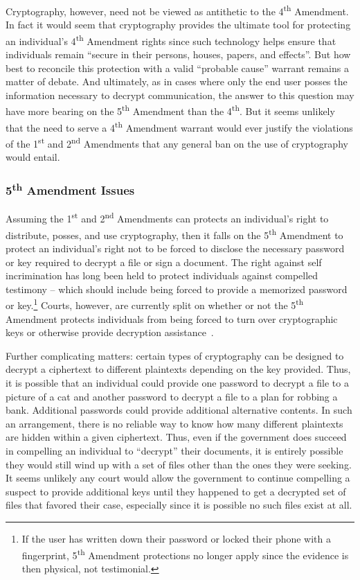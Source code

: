 Cryptography, however, need not be viewed as antithetic to the
4\textsuperscript{th} Amendment. In fact it would seem that
cryptography provides the ultimate tool for protecting an individual's
4\textsuperscript{th} Amendment rights since such technology helps
ensure that individuals remain ``secure in their persons, houses,
papers, and effects''. But how best to reconcile this protection with
a valid ``probable cause'' warrant remains a matter of debate. And
ultimately, as in cases where only the end user posses the information
necessary to decrypt communication, the answer to this question may
have more bearing on the 5\textsuperscript{th} Amendment than the
4\textsuperscript{th}. But it seems unlikely that the need to serve a
4\textsuperscript{th} Amendment warrant would ever justify the
violations of the 1\textsuperscript{st} and 2\textsuperscript{nd}
Amendments that any general ban on the use of cryptography would
entail.

\subsubsection{5\textsuperscript{th} Amendment Issues}

Assuming the 1\textsuperscript{st} and 2\textsuperscript{nd}
Amendments can protects an individual's right to distribute, posses,
and use cryptography, then it falls on the 5\textsuperscript{th}
Amendment to protect an individual's right not to be forced to
disclose the necessary password or key required to decrypt a file or
sign a document. The right against self incrimination has long been
held to protect individuals against compelled testimony -- which
should include being forced to provide a memorized password or
key.\footnote{If the user has written down their password or locked
  their phone with a fingerprint, 5\textsuperscript{th} Amendment
  protections no longer apply since the evidence is then physical, not
  testimonial.}  Courts, however, are currently split on whether or
not the 5\textsuperscript{th} Amendment protects individuals from
being forced to turn over cryptographic keys or otherwise provide
decryption assistance~\cite{usvboucher, commonwealthvgelfgatt,
  usvdoe}.

Further complicating matters: certain types of cryptography can be
designed to decrypt a ciphertext to different plaintexts depending on
the key provided. Thus, it is possible that an individual could
provide one password to decrypt a file to a picture of a cat and
another password to decrypt a file to a plan for robbing a
bank. Additional passwords could provide additional alternative
contents. In such an arrangement, there is no reliable way to know how
many different plaintexts are hidden within a given ciphertext. Thus,
even if the government does succeed in compelling an individual to
``decrypt'' their documents, it is entirely possible they would still
wind up with a set of files other than the ones they were seeking.  It
seems unlikely any court would allow the government to continue
compelling a suspect to provide additional keys until they happened to
get a decrypted set of files that favored their case, especially since
it is possible no such files exist at all.

